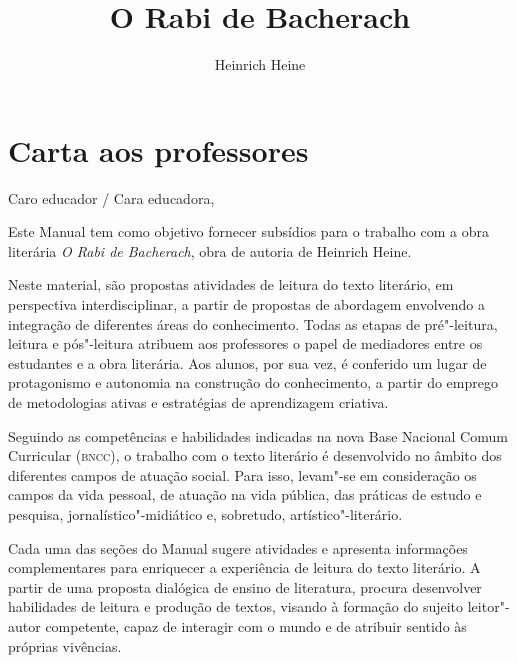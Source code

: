 \documentclass[12pt]{extarticle}
\begin{document}
\newcommand{\AutorLivro}{Heinrich Heine}
\newcommand{\TituloLivro}{O Rabi de Bacherach}
\newcommand{\Tema}{Ficção, mistério e fantasia}
\newcommand{\Genero}{Romance}
\newcommand{\issnppub}{---}
\newcommand{\issnepub}{---}
\newcommand{\colaborador}{\textbf{Michelle Etienne Florence, Bruno Gradella e Vicente Castro} é uma pessoa incrível e vai fazer um bom serviço.}


\title{\TituloLivro}
\author{\AutorLivro}
\def\authornotes{\colaborador}

\date{}
\maketitle
\tableofcontents

\pagebreak

\section{Carta aos professores}

Caro educador / Cara educadora,\\\bigskip

Este Manual tem como objetivo fornecer subsídios para o trabalho com a
obra literária \emph{O Rabi de Bacherach}, obra de autoria de Heinrich
Heine.

Neste material, são propostas atividades de leitura do texto literário,
em perspectiva interdisciplinar, a partir de propostas de abordagem
envolvendo a integração de diferentes áreas do conhecimento. Todas as
etapas de pré"-leitura, leitura e pós"-leitura atribuem aos professores o
papel de mediadores entre os estudantes e a obra literária. Aos alunos,
por sua vez, é conferido um lugar de protagonismo e autonomia na
construção do conhecimento, a partir do emprego de metodologias ativas e
estratégias de aprendizagem criativa.

Seguindo as competências e habilidades indicadas na nova Base Nacional
Comum Curricular (\textsc{bncc}), o trabalho com o texto literário é desenvolvido
no âmbito dos diferentes campos de atuação social. Para isso, levam"-se
em consideração os campos da vida pessoal, de atuação na vida pública,
das práticas de estudo e pesquisa, jornalístico"-midiático e, sobretudo,
artístico"-literário.

Cada uma das seções do Manual sugere atividades e apresenta informações
complementares para enriquecer a experiência de leitura do texto
literário. A partir de uma proposta dialógica de ensino de literatura,
procura desenvolver habilidades de leitura e produção de textos, visando
à formação do sujeito leitor"-autor competente, capaz de interagir com o
mundo e de atribuir sentido às próprias vivências.
\end{document}
